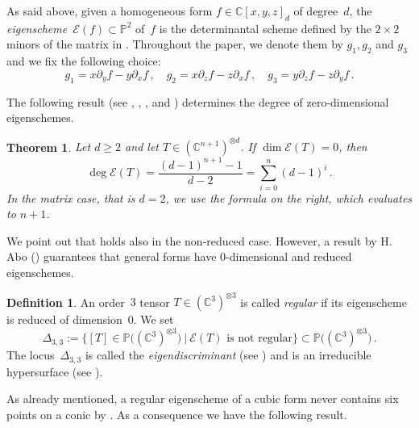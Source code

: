 \documentclass[a4paper, 11pt, reqno]{amsart}
\theoremstyle{plain}
\newtheorem{theorem}[lemma]{Theorem}
\theoremstyle{definition}
\newtheorem{definition}[lemma]{Definition}
\newcommand{\C}{\mathbb{C}}
\newcommand{\p}{\mathbb{P}}
\newcommand{\Eig}[1]{\mathcal{E}\!\left( {#1} \right)}
\begin{document}
As said above, given a homogeneous form $f \in \C[x,y,z]_d$ of degree~$d$, the \emph{eigenscheme}~$\Eig{f} \subset \p^2$ of~$f$ is the determinantal scheme defined by the $2 \times 2$ minors of the matrix in .
Throughout the paper, we denote them by $g_1, g_2$ and $g_3$ and we fix the following choice:
%
\begin{equation}
\label{eq:def_minors}
 g_1 = x \partial_y f - y \partial_x f \,, \quad
 g_2 = x \partial_z f - z \partial_x f \,, \quad
 g_3 = y \partial_z f - z \partial_y f \,.
\end{equation}
%


The following result (see \cite[Theorem 2.1]{CartSturm}, \cite{ASS}, \cite{OO}, and \cite[Equation~5.2]{Abo}) determines the degree of zero-dimensional eigenschemes.

\begin{theorem}
\label{thm:nonempty}
Let $d \ge 2$ and let $T \in (\C^{n+1})^{\otimes d}$.
If $\dim \Eig{T}=0$, then 
%
\[
  \deg \Eig{T} =
  \frac{(d-1)^{n+1}-1}{d-2} =
  \sum_{i=0}^{n} (d-1)^i \,.
\]
%
In the matrix case, that is $d = 2$, we use the formula on the right, which evaluates to $n+1$.
\end{theorem}

We point out that  holds also in the non-reduced case. However, a result by H. Abo (\cite[Corollary 5.8]{Abo}) guarantees that general forms have $0$-dimensional and reduced eigenschemes.

\begin{definition}\label{def: eigendiscriminant}
An order~$3$ tensor $T \in (\C^3)^{\otimes 3}$ is called \emph{regular} if its eigenscheme is reduced of dimension~$0$.
We set
%
\[
 \Delta_{3,3} := \{[T]\in \p \bigl( (\C^3)^{\otimes 3} \bigr) \ | \ \Eig{T} \textrm{\ is \ not \ regular} \} \subset \p \bigl( (\C^3)^{\otimes 3} \bigr) \,.
\]
%
The locus~$\Delta_{3,3}$ is called the \emph{eigendiscriminant} (see \cite[Definition 5.5]{Abo}) and is an irreducible hypersurface (see \cite[Corollary 5.8]{Abo}).
\end{definition}

As already mentioned, a regular eigenscheme of a cubic form never contains six points on a conic by \cite[Theorem 5.1]{ASS}. As a consequence we have the following result.
\end{document}
